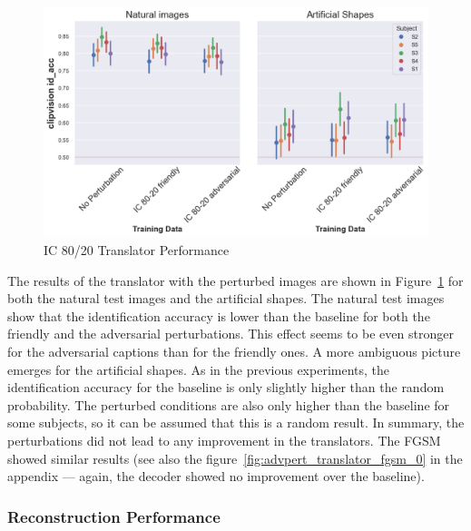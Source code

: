 \begin{figure}[ht]
    \centering
    \includegraphics[width=1\textwidth]{plots/advpert_translator_ic_80-20.png}
    \caption{IC 80/20 Translator Performance}\label{fig:advpert_translator_ic_80}
\end{figure}

The results of the translator with the perturbed images are shown in Figure~\ref{fig:advpert_translator_ic_80} for both the natural test images and the artificial shapes. The natural test images show that the identification accuracy is lower than the baseline for both the friendly and the adversarial perturbations. This effect seems to be even stronger for the adversarial captions than for the friendly ones. A more ambiguous picture emerges for the artificial shapes. As in the previous experiments, the identification accuracy for the baseline is only slightly higher than the random probability. The perturbed conditions are also only higher than the baseline for some subjects, so it can be assumed that this is a random result. In summary, the perturbations did not lead to any improvement in the translators. The FGSM showed similar results (see also the figure~\ref{fig:advpert_translator_fgsm_0} in the appendix --- again, the decoder showed no improvement over the baseline). 


\subsubsection{Reconstruction Performance}


